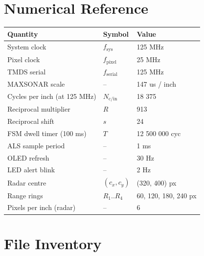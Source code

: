 \documentclass[11pt,a4paper]{article}
\begin{document}
\appendix
\section{Numerical Reference}

\begin{table}[h]
\centering
\begin{tabular}{@{}lll@{}}
\toprule
Quantity & Symbol & Value \\
\midrule
System clock                  & $f_{\text{sys}}$    & 125 MHz \\
Pixel clock                   & $f_{\text{pixel}}$  & 25 MHz \\
TMDS serial                   & $f_{\text{serial}}$ & 125 MHz \\
MAXSONAR scale                & --                  & 147 us / inch \\
Cycles per inch (at 125 MHz)  & $N_{\text{c/in}}$   & 18 375 \\
Reciprocal multiplier         & $R$                 & 913 \\
Reciprocal shift              & $s$                 & 24 \\
FSM dwell timer (100 ms)      & $T$                 & 12 500 000 cyc \\
ALS sample period             & --                  & 1 ms \\
OLED refresh                  & --                  & 30 Hz \\
LED alert blink               & --                  & 2 Hz \\
Radar centre                  & $(c_x, c_y)$        & (320, 400) px \\
Range rings                   & $R_1..R_4$          & 60, 120, 180, 240 px \\
Pixels per inch (radar)       & --                  & 6 \\
\bottomrule
\end{tabular}
\end{table}

\section{File Inventory}
\end{document}
